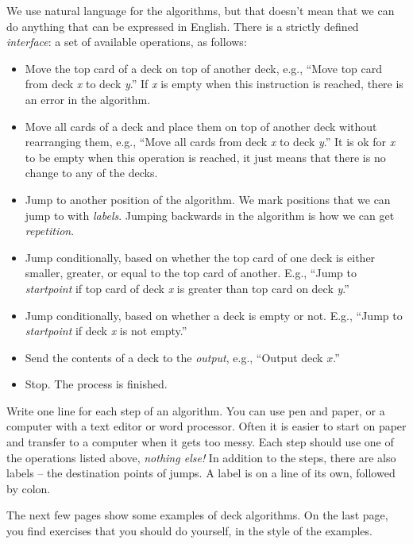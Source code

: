 \documentclass[a4paper,twoside]{tufte-handout}
\begin{document}
We use natural language for the algorithms, but that doesn't mean that
we can do anything that can be expressed in English. There is a
strictly defined \emph{interface}: a set of available operations, as
follows:
\begin{itemize}
\item Move the top card of a deck on top of another deck, e.g., ``Move
  top card from deck \emph{x} to deck \emph{y}.'' If \emph{x} is empty
  when this instruction is reached, there is an error in
  the algorithm.
\item Move all cards of a deck and place them on top of another deck
  without rearranging them, e.g., ``Move all cards from deck \emph{x}
  to deck \emph{y}.'' It is ok for \emph{x} to be empty when this
  operation is reached, it just means that there is no change to any
  of the decks.
\item Jump to another position of the algorithm. We mark positions
  that we can jump to with \emph{labels}. Jumping backwards in the
  algorithm is how we can get \emph{repetition}.
\item Jump conditionally, based on whether the top card of one deck is
  either smaller, greater, or equal to the top card of another. E.g.,
  ``Jump to \emph{startpoint} if top card of deck \emph{x} is greater
  than top card on deck \emph{y}.''
\item Jump conditionally, based on whether a deck is empty or not. E.g.,
  ``Jump to \emph{startpoint} if deck \emph{x} is not empty.''
\item Send the contents of a deck to the \emph{output}, e.g., ``Output deck
  $x$.''
\item Stop. The process is finished.
\end{itemize}

Write one line for each step of an algorithm. You can use pen and
paper, or a computer with a text editor or word processor. Often it is
easier to start on paper and transfer to a computer when it gets too
messy. Each step should use one of the operations listed above,
\emph{nothing else!} In addition to the steps, there are also labels
-- the destination points of jumps. A label is on a
line of its own, followed by colon.

\vspace{3\baselineskip}

\noindent The next few pages show some examples of deck algorithms. On the last
page, you find exercises that you should do yourself, in the style of the
examples.
\end{document}
